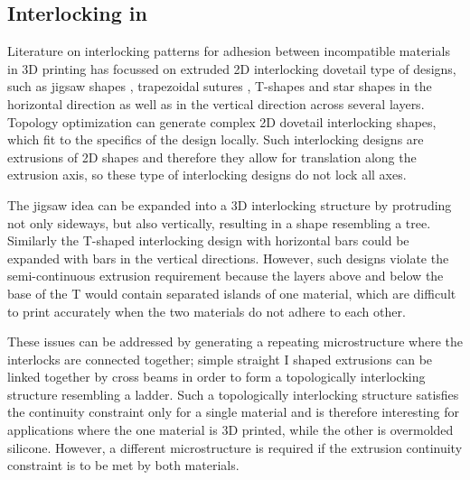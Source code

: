 \subsection{Interlocking in }

Literature on interlocking patterns for adhesion between incompatible materials in  3D printing has focussed on extruded 2D interlocking dovetail type of designs,
such as jigsaw shapes \cite{malik2017}, trapezoidal sutures \cite{Li2013}, T-shapes\cite{Ribeiro2019,mustafa2021development} and star shapes\cite{Wang2021} in the horizontal direction
as well as in the vertical direction across several layers\cite{debora2020}.
Topology optimization can generate complex 2D dovetail interlocking shapes, which fit to the specifics of the design locally\cite{aharoni2021}.
Such interlocking designs are extrusions of 2D shapes and therefore they allow for translation along the extrusion axis, so these type of interlocking designs do not lock all axes.

The jigsaw idea can be expanded into a 3D interlocking structure by protruding not only sideways, but also vertically, resulting in a shape resembling a tree\cite{gouker2006manufacturing}.
Similarly the T-shaped interlocking design with horizontal bars could be expanded with bars in the vertical directions.
However, such designs violate the semi-continuous extrusion requirement because the layers above and below the base of the T would contain separated islands of one material, 
which are difficult to print accurately when the two materials do not adhere to each other.

These issues can be addressed by generating a repeating microstructure where the interlocks are connected together;
simple straight I shaped extrusions can be linked together by cross beams in order to form a topologically interlocking structure resembling a ladder\cite{Rossing2020}.
Such a topologically interlocking structure satisfies the continuity constraint only for a single material and is therefore interesting for applications where the one material is 3D printed, while the other is overmolded silicone.
However, a different microstructure is required if the extrusion continuity constraint is to be met by both materials.



